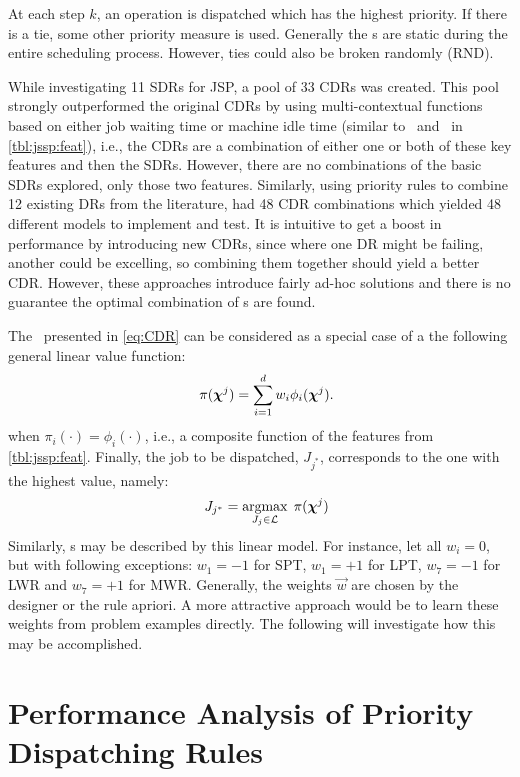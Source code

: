 \documentclass[twocolumn]{svjour3}
\begin{document}
At each step $k$, an operation is dispatched which has the highest 
priority. If there is a tie, some other priority measure is used. Generally 
the \dr s are static during the entire scheduling process. However, ties could 
also be broken randomly (RND). 

While investigating 11 SDRs for JSP, \cite{Lu13} a pool of 33 CDRs was created. 
This pool strongly outperformed the original CDRs by using multi-contextual 
functions based on either job waiting time or machine idle time (similar 
to \phiwait\ and \phimacSlack\ in \cref{tbl:jssp:feat}), i.e., the CDRs are a 
combination of either one or both of these key features and then the SDRs.
However, there are no combinations of the basic SDRs explored, only those two 
features. 
Similarly, using priority rules to combine 12 existing DRs from the literature, 
\cite{Yu13} had 48 CDR combinations which yielded 48 different models 
to implement and test. 
It is intuitive to get a boost in performance by introducing new CDRs, since 
where one DR might be failing, another could be excelling, so combining them 
together should yield a better CDR. However, these approaches introduce fairly 
ad-hoc solutions and there is no guarantee the optimal combination of 
\dr s are found.

The \cdr\ presented in \cref{eq:CDR} can be considered as a special case of a 
the following general linear value function:
\begin{equation}\quad\label{eq:jssp:linweights}
\pi(\bm \chi^j)=\sum_{i=1}^d w_i \phi_i(\bm \chi^j).
\end{equation}
when $\pi_i(\cdot)=\phi_i(\cdot)$, i.e., a composite function of the features 
from \cref{tbl:jssp:feat}. Finally, the job to be dispatched, $J_{j^*}$, 
corresponds to the one with the highest value, namely:
\begin{equation}\quad\label{eq:jstar}
J_{j^*}=\mathop{\rm argmax}_{J_j\in \mathcal{L}}\; \pi(\bm \chi^j)
\end{equation}
Similarly, \sdr s may be described by this linear model. For instance, let all 
$w_i=0$, but with following exceptions: $w_1=-1$ for SPT, $w_1=+1$ for LPT, 
$w_7=-1$ for LWR and $w_7=+1$ for MWR. Generally, the weights $\vec{w}$ are 
chosen by the designer or the 
rule apriori. A more attractive approach would be to learn these weights from 
problem examples directly. The following  will  
investigate how this may be accomplished.

\section{Performance Analysis of Priority Dispatching Rules}\label{sec:learnOPT}
\end{document}
